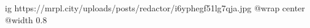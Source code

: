 
 
 
 
 

\ifcmt
  ig https://mrpl.city/uploads/posts/redactor/i6yphegf51lg7qja.jpg
  @wrap center
  @width 0.8
\fi
